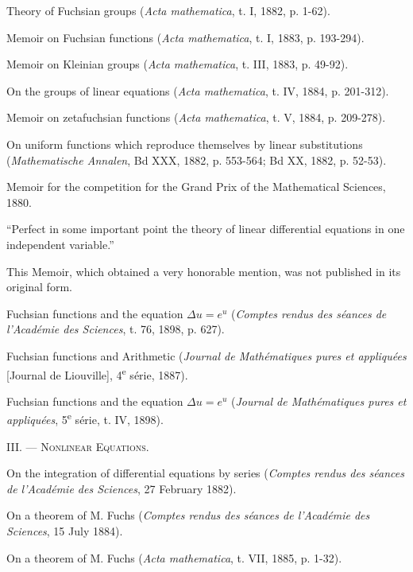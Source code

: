 \documentclass[11pt]{article}
\begin{document}
\begin{description}[leftmargin=3.4em,labelwidth=2.8em,style=nextline]
\item[65.] Theory of Fuchsian groups (\emph{Acta mathematica}, t. I, 1882, p. 1-62).
\item[66.] Memoir on Fuchsian functions (\emph{Acta mathematica}, t. I, 1883, p. 193-294).
\item[68.] Memoir on Kleinian groups (\emph{Acta mathematica}, t. III, 1883, p. 49-92).
\item[69.] On the groups of linear equations (\emph{Acta mathematica}, t. IV, 1884, p. 201-312).
\item[70.] Memoir on zetafuchsian functions (\emph{Acta mathematica}, t. V, 1884, p. 209-278).
\item[101.] On uniform functions which reproduce themselves by linear substitutions (\emph{Mathematische Annalen}, Bd XXX, 1882, p. 553-564; Bd XX, 1882, p. 52-53).
\item[104.] Memoir for the competition for the Grand Prix of the Mathematical Sciences, 1880.

“Perfect in some important point the theory of linear differential equations in one independent variable.”

This Memoir, which obtained a very honorable mention, was not published in its original form.
\item[174.] Fuchsian functions and the equation $\Delta u=e^u$ (\emph{Comptes rendus des séances de l’Académie des Sciences}, t. 76, 1898, p. 627).
\item[191.] Fuchsian functions and Arithmetic (\emph{Journal de Mathématiques pures et appliquées} [Journal de Liouville], 4\textsuperscript{e} série, 1887).
\item[197.] Fuchsian functions and the equation $\Delta u=e^u$ (\emph{Journal de Mathématiques pures et appliquées}, 5\textsuperscript{e} série, t. IV, 1898).
\end{description}

\begin{center}
{\scshape III. — Nonlinear Equations.}
\end{center}

\begin{description}[leftmargin=3.4em,labelwidth=2.8em,style=nextline]
\item[24.] On the integration of differential equations by series (\emph{Comptes rendus des séances de l’Académie des Sciences}, 27 February 1882).
\item[48.] On a theorem of M. Fuchs (\emph{Comptes rendus des séances de l’Académie des Sciences}, 15 July 1884).
\item[71.] On a theorem of M. Fuchs (\emph{Acta mathematica}, t. VII, 1885, p. 1-32).
\end{description}
\end{document}
